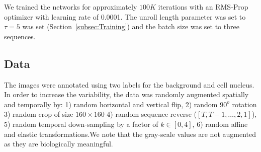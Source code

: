 \documentclass{article}
\begin{document}
We trained the networks for approximately $100K$ iterations with an RMS-Prop optimizer \cite{HintonRMSPROP} with learning rate of 0.0001. The unroll length parameter was set to $\tau =5$ was set (Section~\ref{subsec:Training}) and the batch size was set to three sequences. 

\subsection{Data}
The images were annotated using two labels for the background and cell nucleus. In order to increase the variability, the data was randomly augmented spatially and temporally by: 1) random horizontal and vertical flip, 2) random $90^o$ rotation 3) random crop of size $160\times 160$ 4) random sequence reverse ($[T, T-1,\ldots,2,1]$), 5) random temporal down-sampling by a factor of $k \in [0,4]$, 6) random affine and elastic transformations.We note that the gray-scale values are not augmented as they are biologically meaningful.
\end{document}
